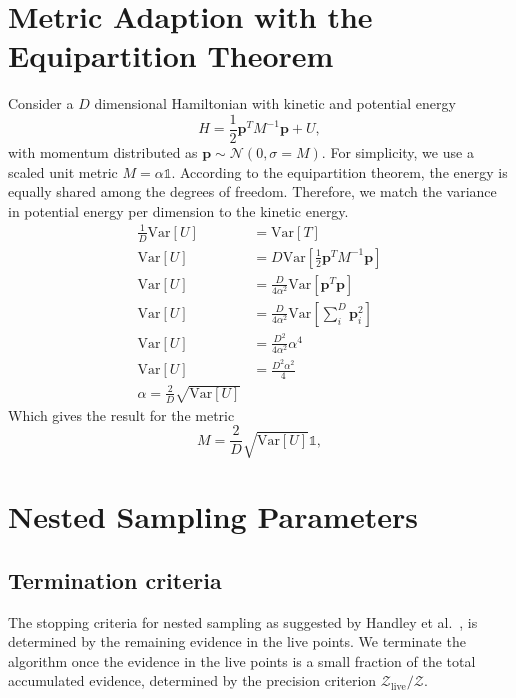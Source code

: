 \documentclass[11pt]{article}
\begin{document}
\section{Metric Adaption with the Equipartition Theorem}\label{sec:metric_derivation}
    Consider a $D$ dimensional Hamiltonian with kinetic and potential energy
    \begin{equation}\label{eq:hamiltonian_appendix}
    H = \frac{1}{2} \mathbf{p}^T M^{-1} \mathbf{p} + U,
    \end{equation}
    with momentum distributed as $\mathbf{p} \sim \mathcal{N}(0, \sigma=M)$.
    For simplicity, we use a scaled unit metric $M = \alpha \mathbb{1}$.
    According to the equipartition theorem, the energy is equally shared among the degrees of freedom.
    Therefore, we match the variance in potential energy per dimension to the kinetic energy.
    \begin{equation}\label{eq:var_matching}
    \begin{aligned}
        \frac{1}{D} \mathrm{Var}[U] &= \mathrm{Var}[T]  \\
        \mathrm{Var}[U] &= D\mathrm{Var}\left[\frac{1}{2} \mathbf{p}^T M^{-1} \mathbf{p}\right]  \\
        \mathrm{Var}[U] &= \frac{D}{4 \alpha^2} \mathrm{Var}\left[\mathbf{p}^T \mathbf{p}\right] \\
        \mathrm{Var}[U] &= \frac{D}{4 \alpha^2} \mathrm{Var}\left[\sum_i^D{\mathbf{p}_i^2}\right] \\
        \mathrm{Var}[U] &= \frac{D^2}{4 \alpha^2} \alpha^4 \\
        \mathrm{Var}[U] &= \frac{D^2 \alpha^2}{4} \\
        \alpha = \frac{2}{D} \sqrt{\mathrm{Var}[U]}
    \end{aligned}
    \end{equation}
    Which gives the result for the metric
    \begin{equation}\label{eq:metric_adaption_appendix}
    M = \frac{2}{D} \sqrt{\mathrm{Var}[U]} \mathbb{1},
    \end{equation}

\section{Nested Sampling Parameters}\label{sec:ns_parameters}
    \subsection{Termination criteria}\label{subsec:termination_criteria}
    The stopping criteria for nested sampling as suggested by Handley et al.~\cite{Handley_2015}, is determined by
    the remaining evidence in the live points.
    We terminate the algorithm once the evidence in the live points is a small fraction of the total accumulated evidence,
    determined by the precision criterion $\mathcal{Z}_{\text{live}} / \mathcal{Z}$.
\end{document}
